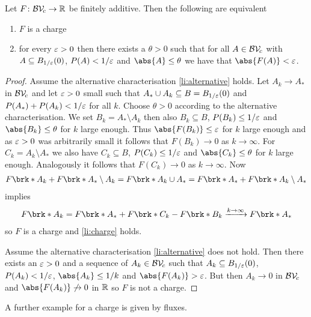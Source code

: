 \begin{lemma}\label{le:alternativeCharge}
Let $F\colon\mathcal{BV\!}_c\to\mathbb{R}$ be finitely additive. Then the following are equivalent
\begin{enumerate}[label=(\roman*)]
	\item
	$F$ is a charge \label{li:charge}
	\item
	for every $\varepsilon>0$ then there exists a $\theta>0$ such that for all $A\in\mathcal{BV\!}_c$ with $A\subseteq B_{1/\varepsilon}(0)$, $P(A)<1/\varepsilon$ and $\abs{A}\leq\theta$ we have that $\abs{F(A)}<\e$. \label{li:alternative}
\end{enumerate}
\end{lemma}
\begin{proof}
Assume the alternative characterisation \ref{li:alternative} holds. Let $A_k\to A_*$ in $\mathcal{BV\!}_c$ and let $\varepsilon>0$ small such that $A_*\cup A_k\subseteq B=B_{1/\varepsilon}(0)$ and $P(A_*)+P(A_k)<1/\varepsilon$ for all $k$. Choose $\theta>0$ according to the alternative characterisation. We set $B_k=A_*\setminus A_k$ then also $B_k\subseteq B$, $P(B_k)\leq 1/\varepsilon$ and $\abs{B_k}\leq\theta$ for $k$ large enough. 
Thus $\abs{F(B_k)}\leq\e$ for $k$ large enough and as $\varepsilon>0$ was arbitrarily small it follows that $F(B_k)\to0$ as $k\to\infty$.
For $C_k=A_k\setminus A_*$ we also have 
$C_k\subseteq B$, $P(C_k)\leq 1/\varepsilon$ and $\abs{C_k}\leq\theta$ for $k$ large enough. Analogously it follows that $F(C_k)\to0$ as $k\to\infty$. 
Now
\begin{align*}
	F\brk*{A_k}+F\brk*{A_*\setminus A_k} = F\brk*{A_k\cup A_*} = F\brk*{A_*}+F\brk*{A_k\setminus A_*}
\end{align*}
implies
\begin{align*}
	F\brk*{A_k} = F\brk*{A_*}+F\brk*{C_k}-F\brk*{B_k}\xrightarrow{k\to\infty}F\brk*{A_*}
\end{align*}
so $F$ is a charge and \ref{li:charge} holds.

Assume the alternative characterisation \ref{li:alternative} does not hold. Then there exists an $\varepsilon>0$ and a sequence of $A_k\in\mathcal{BV\!}_c$ such that $A_k\subseteq B_{1/\varepsilon}(0)$, $P(A_k)<1/\varepsilon$, $\abs{A_k}\leq 1/k$ and $\abs{F(A_k)}>\e$. But then $A_k\to0$ in $\mathcal{BV\!}_c$ and $\abs{F(A_k)}\not\to0$ in $\mathbb{R}$ so $F$ is not a charge.
\end{proof}

A further example for a charge is given by fluxes.

